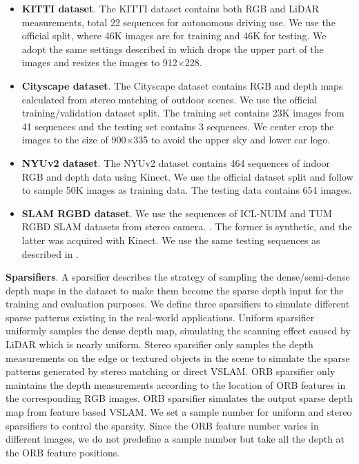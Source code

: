 \documentclass{article}
\begin{document}
\begin{itemize}
\item\textbf{KITTI dataset}. The KITTI dataset contains both RGB and LiDAR measurements, total 22 sequences for autonomous driving use. We use the official split, where 46K images are for training and 46K for testing. We adopt the same settings described in \cite{Ma2017SparseToDense,cheng2018learning} which drops the upper part of the images and resizes the images to 912$\times$228.
\item\textbf{Cityscape dataset}. The Cityscape dataset contains RGB and depth maps calculated from stereo matching of outdoor scenes. We use the official training/validation dataset split. The training set contains 23K images from 41 sequences and the testing set contains 3 sequences. We center crop the images to the size of 900$\times$335 to avoid the upper sky and lower car logo. 
\item\textbf{NYUv2 dataset}. The NYUv2 dataset contains 464 sequences of indoor RGB and depth data using Kinect. We use the official dataset split and follow \cite{Ma2017SparseToDense} to sample 50K images as training data. The testing data contains 654 images.
\item\textbf{SLAM RGBD dataset}. We use the sequences of ICL-NUIM\cite{handa:etal:ICRA2014} and TUM RGBD SLAM datasets from stereo camera. \cite{sturm2012benchmark}. The former is synthetic, and the latter was acquired with Kinect. We use the same testing sequences as described in \cite{tateno2017cnn}.
\end{itemize}

\textbf{Sparsifiers}. A sparsifier describes the strategy of sampling the dense/semi-dense depth maps in the dataset to make them become the sparse depth input for the training and evaluation purposes. We define three sparsifiers to simulate different sparse patterns existing in the real-world applications. Uniform sparsifier uniformly samples the dense depth map, simulating the scanning effect caused by LiDAR which is nearly uniform. Stereo sparsifier only samples the depth measurements on the edge or textured objects in the scene to simulate the sparse patterns generated by stereo matching or direct VSLAM. ORB sparsifier only maintains the depth measurements according to the location of ORB features in the corresponding RGB images. ORB sparsifier simulates the output sparse depth map from feature based VSLAM. We set a sample number for uniform and stereo sparsifiers to control the sparsity. Since the ORB feature number varies in different images, we do not predefine a sample number but take all the depth at the ORB feature positions. 
\end{document}
